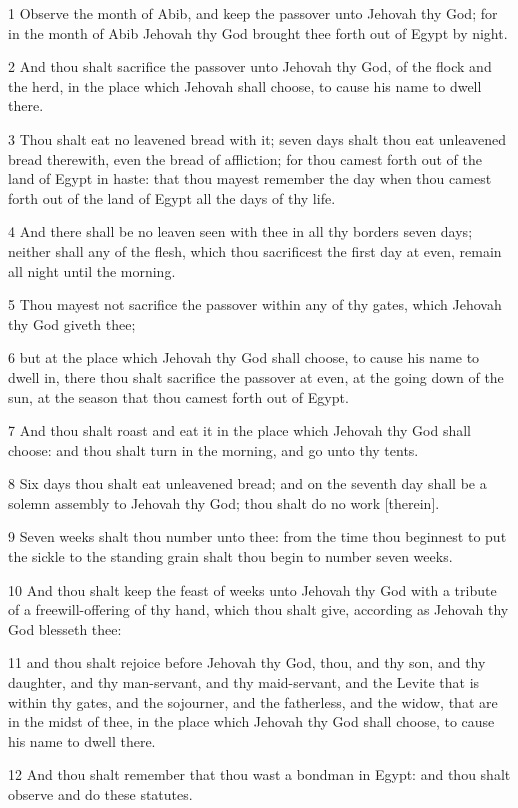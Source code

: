 \par 1 Observe the month of Abib, and keep the passover unto Jehovah thy God; for in the month of Abib Jehovah thy God brought thee forth out of Egypt by night.
\par 2 And thou shalt sacrifice the passover unto Jehovah thy God, of the flock and the herd, in the place which Jehovah shall choose, to cause his name to dwell there.
\par 3 Thou shalt eat no leavened bread with it; seven days shalt thou eat unleavened bread therewith, even the bread of affliction; for thou camest forth out of the land of Egypt in haste: that thou mayest remember the day when thou camest forth out of the land of Egypt all the days of thy life.
\par 4 And there shall be no leaven seen with thee in all thy borders seven days; neither shall any of the flesh, which thou sacrificest the first day at even, remain all night until the morning.
\par 5 Thou mayest not sacrifice the passover within any of thy gates, which Jehovah thy God giveth thee;
\par 6 but at the place which Jehovah thy God shall choose, to cause his name to dwell in, there thou shalt sacrifice the passover at even, at the going down of the sun, at the season that thou camest forth out of Egypt.
\par 7 And thou shalt roast and eat it in the place which Jehovah thy God shall choose: and thou shalt turn in the morning, and go unto thy tents.
\par 8 Six days thou shalt eat unleavened bread; and on the seventh day shall be a solemn assembly to Jehovah thy God; thou shalt do no work [therein].
\par 9 Seven weeks shalt thou number unto thee: from the time thou beginnest to put the sickle to the standing grain shalt thou begin to number seven weeks.
\par 10 And thou shalt keep the feast of weeks unto Jehovah thy God with a tribute of a freewill-offering of thy hand, which thou shalt give, according as Jehovah thy God blesseth thee:
\par 11 and thou shalt rejoice before Jehovah thy God, thou, and thy son, and thy daughter, and thy man-servant, and thy maid-servant, and the Levite that is within thy gates, and the sojourner, and the fatherless, and the widow, that are in the midst of thee, in the place which Jehovah thy God shall choose, to cause his name to dwell there.
\par 12 And thou shalt remember that thou wast a bondman in Egypt: and thou shalt observe and do these statutes.
